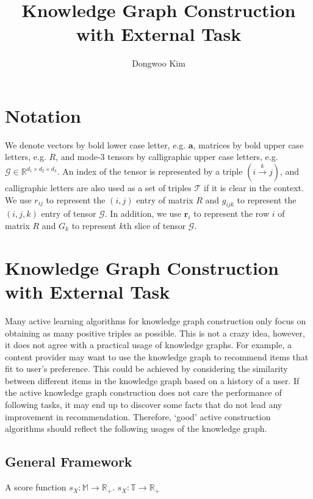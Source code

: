 \documentclass{article} %
\title{Knowledge Graph Construction with External Task}
\author{
Dongwoo Kim
}
\theoremstyle{definition}
\newcommand\ts{\mathcal} %
\newcommand\mt{} %
\newcommand\vt{\mathbf} %
\newcommand\triple[3]{(#1 \stackrel{#2}\rightarrow #3)}
\begin{document}
\maketitle

\section{Notation}
We denote vectors by bold lower case letter, e.g. $\vt{a}$, matrices by bold upper case letters, e.g. $\mt{R}$, and mode-3 tensors by calligraphic upper case letters, e.g. $\ts{G} \in \mathbb{R}^{d_1 \times d_2 \times d_3}$. An index of the tensor is represented by a triple $\triple{i}{k}{j}$, and calligraphic letters are also used as a set of triples $\ts{T}$ if it is clear in the context. We use $r_{ij}$ to represent the $(i,j)$ entry of matrix $\mt{R}$ and $g_{ijk}$ to represent the $(i,j,k)$ entry of tensor $\ts{G}$. In addition, we use $\vt{r}_i$ to represent the row $i$ of matrix $\mt{R}$ and $G_k$ to represent $k$th slice of tensor $\ts{G}$.

\section{Knowledge Graph Construction with External Task}

Many active learning algorithms for knowledge graph construction only focus on obtaining as many positive triples as possible. This is not a crazy idea, however, it does not agree with a practical usage of knowledge graphs. For example, a content provider may want to use the knowledge graph to recommend items that fit to user's preference. This could be achieved by considering the similarity between different items in the knowledge graph based on a history of a user. If the active knowledge graph construction does not care the performance of following tasks, it may end up to discover some facts that do not lead any improvement in recommendation. Therefore, `good' active construction algorithms should reflect the following usages of the knowledge graph.

\subsection{General Framework}
A score function $s_\mt{X}: \mathbb{M} \rightarrow \mathbb{R}_+$.
$s_\mt{X}: \mathbb{T} \rightarrow \mathbb{R}_+$
\end{document}
